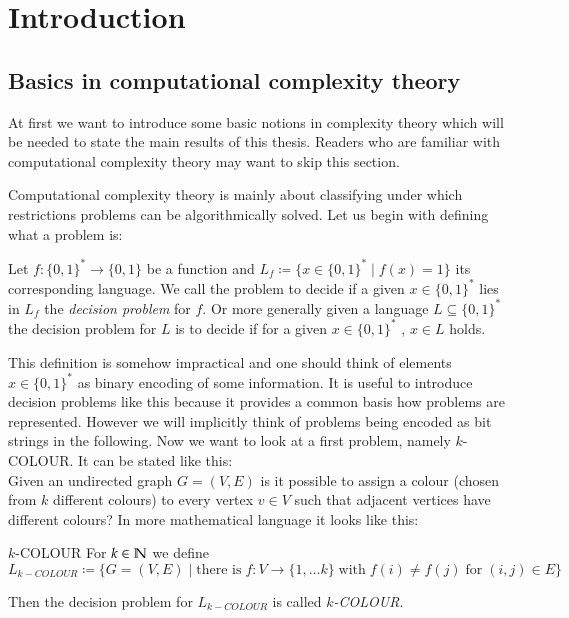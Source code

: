 \section{Introduction}

\subsection{Basics in computational complexity theory}
At first we want to introduce some basic notions in complexity theory which will be needed to state the main results of this thesis.
Readers who are familiar with computational complexity theory may want to skip this section.

Computational complexity theory is mainly about classifying under which restrictions problems can be algorithmically solved.
Let us begin with defining what a problem is:

\begin{Definition}
 Let $f \colon {\lbrace 0,1 \rbrace}^* \to {\lbrace 0,1 \rbrace}$ be a function and $L_f \coloneqq {\lbrace 
 x \in {\lbrace 0,1 \rbrace}^*  \; | \; f(x) = 1 \rbrace} $ its corresponding language. We call the 
 problem to decide if a given $x \in {\lbrace 0,1 \rbrace}^*$ lies in $L_f$ the \emph{decision problem} for $f$.
 Or more generally given a language $L \subseteq {\lbrace 0,1 \rbrace}^*$ the decision problem for $L$ is to decide
 if for a given $x \in {\lbrace 0,1 \rbrace}^* $ , $x \in L$ holds.
\end{Definition}

This definition is somehow impractical and one should think of elements $x \in {\lbrace 0,1 \rbrace}^*$ as binary encoding
of some information. It is useful to introduce decision problems like this because it provides a common basis how problems
are represented. However we will implicitly think of problems being encoded as bit strings in the following. Now
we want to look at a first problem, namely $k$-COLOUR. It can be stated like this: \\
 Given an undirected graph $ G = (V,E)$ is it possible to assign a colour (chosen from $k$ different colours) to every vertex 
 $v \in V$ such that adjacent vertices have different colours? In more mathematical language it looks like this:

\begin{Problem}{$k$-COLOUR}
 For $k \in \mathbb{N}$ we define $$L_{k-COLOUR} \coloneqq \lbrace G  = (V,E) \; | \; \text{there is} \; f \colon V \to \lbrace 1, \dotsc k \rbrace
 \; \text{with} \; f(i) \neq f(j) \; \text{for} \; (i,j) \in E \rbrace $$
 
 Then the decision problem for $L_{k-COLOUR}$ is called \emph{$k$-COLOUR}.
\end{Problem}


